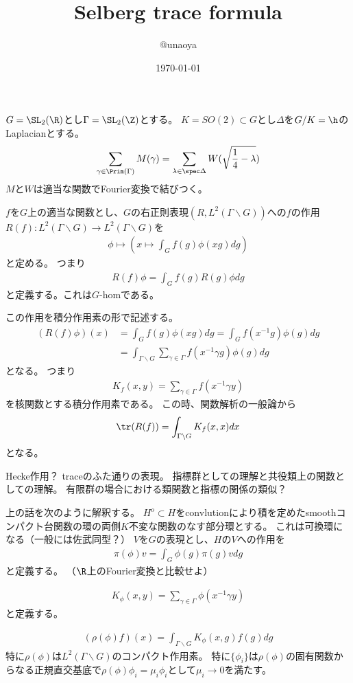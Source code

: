 \documentclass{jsarticle}
\title{Selberg trace formula}
\author{@unaoya}
\date{\today}
\begin{document}
\maketitle

$G=\SL_2(\R)$とし$\Gamma=\SL_2(\Z)$とする。
$K=SO(2)\subset G$とし$\Delta$を$G/K=\h$のLaplacianとする。
\begin{align*}
\sum_{\gamma\in\Prim(\Gamma)}M(\gamma)=\sum_{\lambda\in\spec\Delta}W(\sqrt{\frac{1}{4}-\lambda})
\end{align*}
$M$と$W$は適当な関数でFourier変換で結びつく。

$f$を$G$上の適当な関数とし、$G$の右正則表現$(R, L^2(\Gamma\backslash G))$への$f$の作用$R(f):L^2(\Gamma\backslash G)\to L^2(\Gamma\backslash G)$を
\begin{align*}
\phi\mapsto(x\mapsto\int_Gf(g)\phi(xg)dg)
\end{align*}
と定める。
つまり
\begin{align*}
R(f)\phi=\int_Gf(g)R(g)\phi dg
\end{align*}
と定義する。これは$G$-homである。

この作用を積分作用素の形で記述する。
\begin{align*}
(R(f)\phi)(x)&=\int_Gf(g)\phi(xg)dg=\int_Gf(x^{-1}g)\phi(g)dg\\
&=\int_{\Gamma\backslash G}\sum_{\gamma\in\Gamma}f(x^{-1}\gamma g)\phi(g)dg
\end{align*}
となる。
つまり
\begin{align*}
K_f(x,y)=\sum_{\gamma\in\Gamma}f(x^{-1}\gamma y)
\end{align*}
を核関数とする積分作用素である。
この時、関数解析の一般論から
\begin{align*}
\tr(R(f))=\int_{\Gamma\backslash G}K_f(x,x)dx
\end{align*}
となる。

Hecke作用？
traceのふた通りの表現。
指標群としての理解と共役類上の関数としての理解。
有限群の場合における類関数と指標の関係の類似？

上の話を次のように解釈する。
$H^o \subset H$をconvlutionにより積を定めたsmoothコンパクト台関数の環の両側$K$不変な関数のなす部分環とする。
これは可換環になる（一般には佐武同型？）
$V$を$G$の表現とし、$H$の$V$への作用を
\begin{align*}
\pi(\phi)v=\int_G\phi(g)\pi(g)vdg
\end{align*}
と定義する。
（$\R$上のFourier変換と比較せよ）

\begin{align*}
K_\phi(x,y)=\sum_{\gamma\in\Gamma}\phi(x^{-1}\gamma y)
\end{align*}
と定義する。
\begin{prop}
\begin{align*}
(\rho(\phi)f)(x)=\int_{\Gamma\backslash G}K_\phi(x,g)f(g)dg
\end{align*}
特に$\rho(\phi)$は$L^2(\Gamma\backslash G)$のコンパクト作用素。
特に$\{\phi_i\}$は$\rho(\phi)$の固有関数からなる正規直交基底で$\rho(\phi)\phi_i=\mu_i\phi_i$として$\mu_i\to0$を満たす。
\end{prop}
\end{document}
